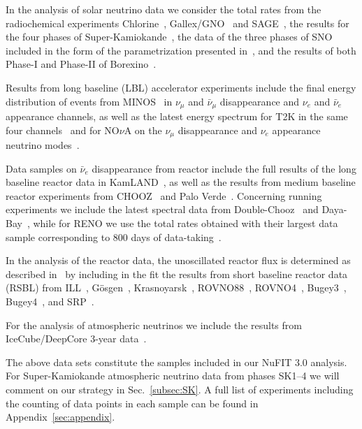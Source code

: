 \documentclass[a4paper, 11pt]{article}
\begin{document}
In the analysis of solar neutrino data we consider the total rates
from the radiochemical experiments Chlorine~\cite{Cleveland:1998nv},
Gallex/GNO~\cite{Kaether:2010ag} and SAGE~\cite{Abdurashitov:2009tn},
the results for the four phases of
Super-Kamiokande~\cite{Hosaka:2005um, Cravens:2008aa, Abe:2010hy,
  sksol:nakano2016, sksol:ichep2016}, the data of the three phases of
SNO included in the form of the parametrization presented
in~\cite{Aharmim:2011vm}, and the results of both Phase-I and Phase-II
of Borexino~\cite{Bellini:2011rx, Bellini:2008mr, Bellini:2014uqa}.

Results from long baseline (LBL) accelerator experiments include the
final energy distribution of events from MINOS~\cite{Adamson:2013whj,
  Adamson:2013ue} in $\nu_\mu$ and $\bar\nu_\mu$ disappearance and
$\nu_e$ and $\bar\nu_e$ appearance channels, as well as the latest
energy spectrum for T2K in the same four channels~\cite{t2k:ichep2016,
  t2k:susy2016} and for NO$\nu$A on the $\nu_\mu$ disappearance and
$\nu_e$ appearance neutrino modes~\cite{nova:nu2016}.

Data samples on $\bar\nu_e$ disappearance from reactor include the full
results of the long baseline reactor data in
KamLAND~\cite{Gando:2010aa}, as well as the results from medium
baseline reactor experiments from CHOOZ~\cite{Apollonio:1999ae} and
Palo Verde~\cite{Piepke:2002ju}. Concerning running experiments we
include the latest spectral data from
Double-Chooz~\cite{dc:moriond2016} and Daya-Bay~\cite{db:nu2016},
while for RENO we use the total rates obtained with their largest data
sample corresponding to 800 days of data-taking~\cite{reno:nu2014}.

In the analysis of the reactor data, the unoscillated reactor flux is
determined as described in~\cite{Kopp:2013vaa} by including in the fit
the results from short baseline reactor data (RSBL) from
ILL~\cite{Kwon:1981ua}, G\"osgen~\cite{Zacek:1986cu},
Krasnoyarsk~\cite{Vidyakin:1987ue, Vidyakin:1994ut},
ROVNO88~\cite{Afonin:1988gx}, ROVNO4~\cite{Kuvshinnikov:1990ry},
Bugey3~\cite{Declais:1994su}, Bugey4~\cite{Declais:1994ma}, and
SRP~\cite{Greenwood:1996pb}.

For the analysis of atmospheric neutrinos we include the results from
IceCube/DeepCore 3-year data~\cite{Aartsen:2014yll}.

The above data sets constitute the samples included in our NuFIT 3.0
analysis.  For Super-Kamiokande atmospheric neutrino data from phases
SK1--4 we will comment on our strategy in Sec.~\ref{subsec:SK}.  A
full list of experiments including the counting of data points in each
sample can be found in Appendix~\ref{sec:appendix}.
\end{document}
